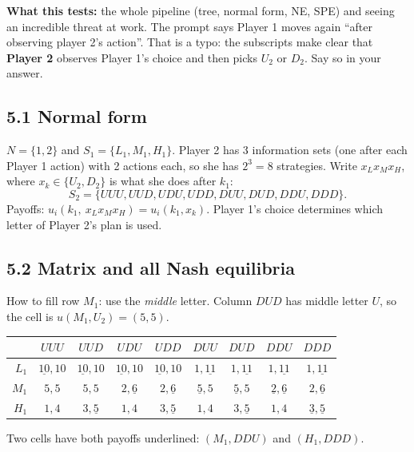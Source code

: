 \documentclass[11pt]{article}
\begin{document}
\textbf{What this tests:} the whole pipeline (tree, normal form, NE, SPE) and seeing an incredible threat at work. The prompt says Player 1 moves again ``after observing player 2's action''. That is a typo: the subscripts make clear that \textbf{Player 2} observes Player 1's choice and then picks $U_2$ or $D_2$. Say so in your answer.

\subsection*{5.1 Normal form}
$N=\{1,2\}$ and $S_1=\{L_1,M_1,H_1\}$. Player 2 has 3 information sets (one after each Player 1 action) with 2 actions each, so she has $2^3=8$ strategies. Write $x_Lx_Mx_H$, where $x_k\in\{U_2,D_2\}$ is what she does after $k_1$:
\[
S_2=\{UUU,UUD,UDU,UDD,DUU,DUD,DDU,DDD\}.
\]
Payoffs: $u_i(k_1,\ x_Lx_Mx_H)=u_i(k_1,x_k)$. Player 1's choice determines which letter of Player 2's plan is used.

\subsection*{5.2 Matrix and all Nash equilibria}
How to fill row $M_1$: use the \emph{middle} letter. Column $DUD$ has middle letter $U$, so the cell is $u(M_1,U_2)=(5,5)$.
\begin{center}
\small
\setlength{\tabcolsep}{4pt}
\begin{tabular}{r|cccccccc}
 & $UUU$ & $UUD$ & $UDU$ & $UDD$ & $DUU$ & $DUD$ & $DDU$ & $DDD$ \\ \hline
$L_1$ & $\underline{10},10$ & $\underline{10},10$ & $\underline{10},10$ & $\underline{10},10$ & $1,\underline{11}$ & $1,\underline{11}$ & $1,\underline{11}$ & $1,\underline{11}$ \\
$M_1$ & $5,5$ & $5,5$ & $2,\underline{6}$ & $2,\underline{6}$ & $\underline{5},5$ & $\underline{5},5$ & $\underline{2},\underline{6}$ & $2,\underline{6}$ \\
$H_1$ & $1,4$ & $3,\underline{5}$ & $1,4$ & $3,\underline{5}$ & $1,4$ & $3,\underline{5}$ & $1,4$ & $\underline{3},\underline{5}$
\end{tabular}
\end{center}
Two cells have both payoffs underlined: $(M_1,DDU)$ and $(H_1,DDD)$.
\end{document}
